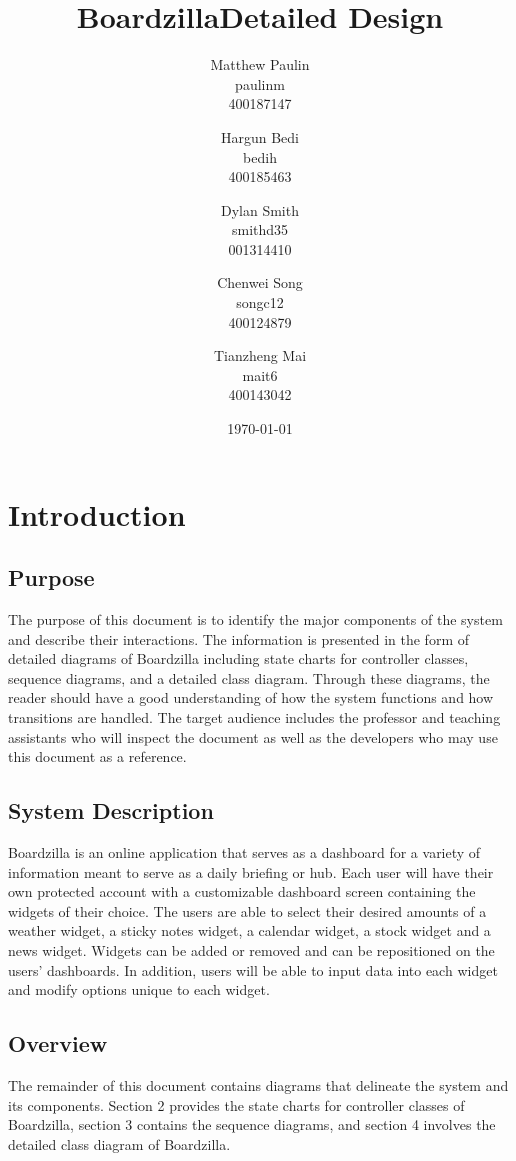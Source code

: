 \documentclass[]{article}
\title{\textbf{Boardzilla\break Detailed Design}}
\author{Matthew Paulin \\ paulinm \\ 400187147 \and
        Hargun Bedi \\ bedih \\ 400185463 \and
        Dylan Smith \\ smithd35 \\ 001314410 \and
        Chenwei Song \\ songc12 \\ 400124879 \and
        Tianzheng Mai \\ mait6 \\ 400143042
}
\date{\today}
\begin{document}
\maketitle	

\section{Introduction}
\label{sec:introduction}
\subsection{Purpose}
\label{sub:purpose}
The purpose of this document is to identify the major components of the system and describe their interactions. The information is presented in the form of detailed diagrams of Boardzilla including state charts for controller classes, sequence diagrams, and a detailed class diagram. Through these diagrams, the reader should have a good understanding of how the system functions and how transitions are handled. The target audience includes the professor and teaching assistants who will inspect the document as well as the developers who may use this document as a reference.

\subsection{System Description}
\label{sub:system_description}
Boardzilla is an online application that serves as a dashboard for a variety of information meant to serve as a daily briefing or hub. Each user will have their own protected account with a customizable dashboard screen containing the widgets of their choice. The users are able to select their desired amounts of a weather widget, a sticky notes widget, a calendar widget, a stock widget and a news widget. Widgets can be added or removed and can be repositioned on the users' dashboards. In addition, users will be able to input data into each widget and modify options unique to each widget.

\subsection{Overview}
\label{sub:overview}
The remainder of this document contains diagrams that delineate the system and its components. Section 2 provides the state charts for controller classes of Boardzilla, section 3 contains the sequence diagrams, and section 4 involves the detailed class diagram of Boardzilla.
\end{document}
